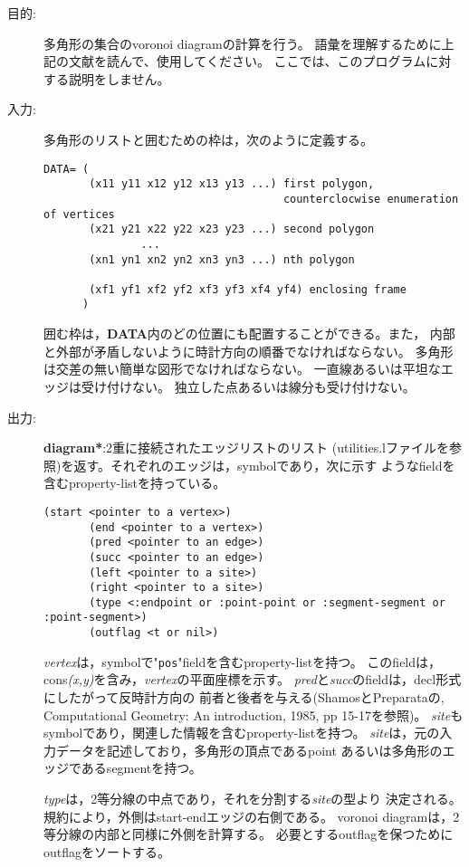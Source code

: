 \begin{description}
\item[目的:] 多角形の集合のvoronoi diagramの計算を行う。
語彙を理解するために上記の文献を読んで、使用してください。
ここでは、このプログラムに対する説明をしません。

\item[入力:] 多角形のリストと囲むための枠は，次のように定義する。
\begin{verbatim}
DATA= (
       (x11 y11 x12 y12 x13 y13 ...) first polygon,
                                     counterclocwise enumeration of vertices
       (x21 y21 x22 y22 x23 y23 ...) second polygon
               ... 
       (xn1 yn1 xn2 yn2 xn3 yn3 ...) nth polygon
	     
       (xf1 yf1 xf2 yf2 xf3 yf3 xf4 yf4) enclosing frame
      )
\end{verbatim}
囲む枠は，{\bf DATA}内のどの位置にも配置することができる。また，
内部と外部が矛盾しないように時計方向の順番でなければならない。
多角形は交差の無い簡単な図形でなければならない。
一直線あるいは平坦なエッジは受け付けない。
独立した点あるいは線分も受け付けない。

\item[出力:] {\bf *diagram*}:2重に接続されたエッジリストのリスト
(utilities.lファイルを参照)を返す。それぞれのエッジは，symbolであり，次に示す
ようなfieldを含むproperty-listを持っている。
\begin{verbatim}
(start <pointer to a vertex>)
       (end <pointer to a vertex>)
       (pred <pointer to an edge>)
       (succ <pointer to an edge>)
       (left <pointer to a site>)
       (right <pointer to a site>)
       (type <:endpoint or :point-point or :segment-segment or :point-segment>)
       (outflag <t or nil>)
\end{verbatim}
{\em vertex}は，symbolで"{\tt pos}"fieldを含むproperty-listを持つ。
このfieldは，cons{\em (x,y)}を含み，{\em vertex}の平面座標を示す。
{\em pred}と{\em succ}のfieldは，decl形式にしたがって反時計方向の
前者と後者を与える(ShamosとPreparataの,
Computational Geometry: An introduction, 1985, pp 15-17を参照)。
{\em site}もsymbolであり，関連した情報を含むproperty-listを持つ。
{\em site}は，元の入力データを記述しており，多角形の頂点であるpoint
あるいは多角形のエッジであるsegmentを持つ。

{\em type}は，2等分線の中点であり，それを分割する{\em site}の型より
決定される。
規約により，外側はstart-endエッジの右側である。
voronoi diagramは，2等分線の内部と同様に外側を計算する。
必要とするoutflagを保つためにoutflagをソートする。


\end{description}
